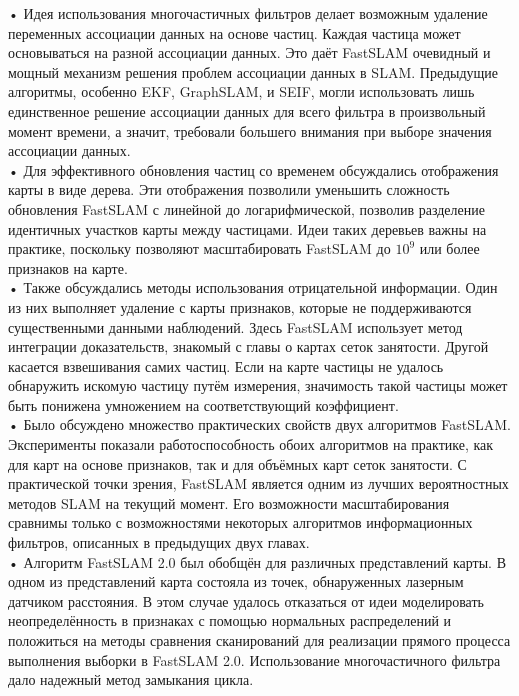 \documentclass[10pt,a4paper]{article}
\begin{document}
•	Идея использования многочастичных фильтров делает возможным удаление переменных ассоциации данных на основе частиц.   Каждая частица может основываться на разной ассоциации данных. Это даёт FastSLAM очевидный и мощный механизм решения проблем ассоциации данных в SLAM. Предыдущие алгоритмы, особенно EKF, GraphSLAM, и SEIF, могли использовать лишь единственное решение ассоциации данных для всего фильтра в произвольный момент времени, а значит, требовали большего внимания при выборе значения ассоциации данных.\\

•	Для эффективного обновления частиц со временем обсуждались отображения карты в виде дерева. Эти отображения позволили уменьшить сложность обновления FastSLAM с линейной до логарифмической, позволив разделение идентичных участков карты между частицами. Идеи таких деревьев важны на практике, поскольку позволяют масштабировать FastSLAM до $10^9$ или более признаков на карте.\\

•	Также обсуждались методы использования отрицательной информации. Один из них выполняет удаление с карты признаков, которые не поддерживаются существенными данными наблюдений. Здесь FastSLAM использует метод интеграции доказательств, знакомый с главы о картах сеток занятости. Другой касается взвешивания самих частиц. Если на карте частицы не удалось обнаружить искомую частицу путём измерения, значимость такой частицы может быть понижена умножением на соответствующий коэффициент.\\

•	Было обсуждено множество практических свойств двух алгоритмов FastSLAM. Эксперименты показали работоспособность обоих алгоритмов на практике, как для карт на основе признаков, так и для объёмных карт сеток занятости. С практической точки зрения, FastSLAM является одним из лучших вероятностных методов SLAM на текущий момент. Его возможности масштабирования сравнимы только с возможностями некоторых алгоритмов информационных фильтров, описанных в предыдущих двух главах.\\

•	Алгоритм FastSLAM 2.0 был обобщён для различных представлений карты. В одном из представлений карта состояла из точек, обнаруженных лазерным датчиком расстояния. В этом случае удалось отказаться от идеи моделировать неопределённость в признаках с помощью нормальных распределений и положиться на методы сравнения сканирований для реализации прямого процесса выполнения выборки в FastSLAM 2.0. Использование многочастичного фильтра дало надежный метод замыкания цикла.\\
\end{document}
